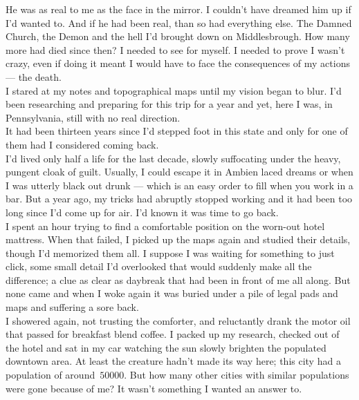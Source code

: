 \documentclass[a5paper]{scrartcl}
\begin{document}
He was as real to me as the face in the mirror. I couldn't have dreamed him up if I'd wanted to. And if he had been real, than so had everything else. The Damned Church, the Demon and the hell I'd brought down on Middlesbrough. How many more had died since then? I needed to see for myself. I needed to prove I wasn't crazy, even if doing it meant I would have to face the consequences of my actions --- the death.  \\


I stared at my notes and topographical maps until my vision began to blur. I'd been researching and preparing for this trip for a year and yet, here I was, in Pennsylvania, still with no real direction.\\


It had been thirteen years since I'd stepped foot in this state and only for one of them had I considered coming back. \\


I'd lived only half a life for  the last decade, slowly suffocating under the heavy, pungent cloak of guilt. Usually, I could escape it in Ambien laced dreams or when I was utterly black out drunk --- which is an easy order to fill when you work in a bar. But a year ago, my tricks had abruptly stopped working and it had been too long since I'd come up for air. I'd known it was time to go back.\\


I spent an hour trying to find a comfortable position on the worn-out hotel mattress. When that failed, I picked up the maps again and studied their details, though I'd memorized them all. I suppose I was waiting for something to just click, some small detail I'd overlooked that would suddenly make all the difference; a clue as clear as daybreak that had been in front of me all along. But none came and when I woke again it was buried under a pile of legal pads and maps and suffering a sore back.\\


I showered again, not trusting the comforter, and reluctantly drank the motor oil that passed for breakfast blend coffee. I packed up my research, checked out of the hotel and sat in my car watching the sun slowly brighten the populated downtown area. At least the creature hadn't made its way here; this city had a population of around~$\num{50000}$. But how many other cities with similar populations were gone because of me? It wasn't something I wanted an answer to.\\
\end{document}
